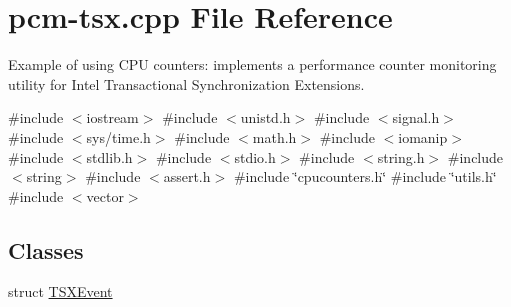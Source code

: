 \hypertarget{pcm-tsx_8cpp}{}\section{pcm-\/tsx.cpp File Reference}
\label{pcm-tsx_8cpp}


Example of using C\+PU counters\+: implements a performance counter monitoring utility for Intel Transactional Synchronization Extensions.  


{\ttfamily \#include $<$iostream$>$}\newline
{\ttfamily \#include $<$unistd.\+h$>$}\newline
{\ttfamily \#include $<$signal.\+h$>$}\newline
{\ttfamily \#include $<$sys/time.\+h$>$}\newline
{\ttfamily \#include $<$math.\+h$>$}\newline
{\ttfamily \#include $<$iomanip$>$}\newline
{\ttfamily \#include $<$stdlib.\+h$>$}\newline
{\ttfamily \#include $<$stdio.\+h$>$}\newline
{\ttfamily \#include $<$string.\+h$>$}\newline
{\ttfamily \#include $<$string$>$}\newline
{\ttfamily \#include $<$assert.\+h$>$}\newline
{\ttfamily \#include \char`\"{}cpucounters.\+h\char`\"{}}\newline
{\ttfamily \#include \char`\"{}utils.\+h\char`\"{}}\newline
{\ttfamily \#include $<$vector$>$}\newline
\subsection*{Classes}
\begin{DoxyCompactItemize}
\item 
struct \mbox{\hyperlink{struct_t_s_x_event}{T\+S\+X\+Event}}
\end{DoxyCompactItemize}
